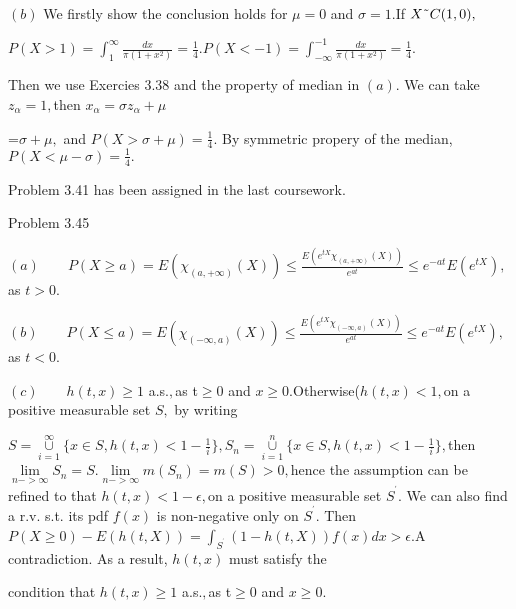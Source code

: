 \documentclass{article}
\begin{document}
$\left( b\right) $ We firstly show the conclusion holds for $\mu =0$ and $%
\sigma =1.$If $X\symbol{126}C(1,0),$

$P\left( X>1\right) =\int_{1}^{\infty }\frac{dx}{\pi \left( 1+x^{2}\right) }=%
\frac{1}{4}.P\left( X<-1\right) =\int_{-\infty }^{-1}\frac{dx}{\pi \left(
1+x^{2}\right) }=\frac{1}{4}.$

Then we use Exercies 3.38 and the property of median in $\left( a\right) .$
We can take $z_{\alpha }=1,$then $x_{\alpha }=\sigma z_{\alpha }+\mu $

=$\sigma +\mu ,$ and $P\left( X>\sigma +\mu \right) =\frac{1}{4}.$ By
symmetric propery of the median,  $P\left( X<\mu -\sigma \right) =\frac{1}{4}%
.$

Problem 3.41 has been assigned in the last coursework. 

Problem 3.45

$\left( a\right) \qquad P\left( X\geq a\right) =E\left( \chi _{\left(
a,+\infty \right) }\left( X\right) \right) \leq \frac{E\left( e^{tX}\chi
_{\left( a,+\infty \right) }\left( X\right) \right) }{e^{at}}\leq
e^{-at}E\left( e^{tX}\right) ,$as $t>0.$

$\left( b\right) \qquad P\left( X\leq a\right) =E\left( \chi _{\left(
-\infty ,a\right) }\left( X\right) \right) \leq \frac{E\left( e^{tX}\chi
_{\left( -\infty ,a\right) }\left( X\right) \right) }{e^{at}}\leq
e^{-at}E\left( e^{tX}\right) ,$as $t<0.$

$\left( c\right) \qquad h\left( t,x\right) \geq 1$ a.s.$,$as t$\geq 0$ and $%
x\geq 0.$Otherwise($h\left( t,x\right) <1,$on a positive measurable set $S,$%
by writing

$S=\underset{i=1}{\overset{\infty }{\cup }}\{x\in S,h\left( t,x\right) <1-%
\frac{1}{i}\},S_{n}=\underset{i=1}{\overset{n}{\cup }}\{x\in S,h\left(
t,x\right) <1-\frac{1}{i}\},$then $\underset{n->\infty }{\lim }S_{n}=S.%
\underset{n->\infty }{\lim }m\left( S_{n}\right) =m\left( S\right) >0,$hence
the assumption can be refined to that $h\left( t,x\right) <1-\epsilon ,$on a
positive measurable set $S^{^{\prime }}.$ We can also find a r.v. s.t. its
pdf $f\left( x\right) $ is non-negative only on $S^{^{\prime }}$. Then $%
P\left( X\geq 0\right) -E\left( h\left( t,X\right) \right)
=\int_{S^{^{\prime }}}\left( 1-h\left( t,X\right) \right) f\left( x\right)
dx>\epsilon .$A contradiction. As a result, $h\left( t,x\right) $ must
satisfy the 

condition that $h\left( t,x\right) \geq 1$ a.s.$,$as t$\geq 0$ and $x\geq 0.$
\end{document}
